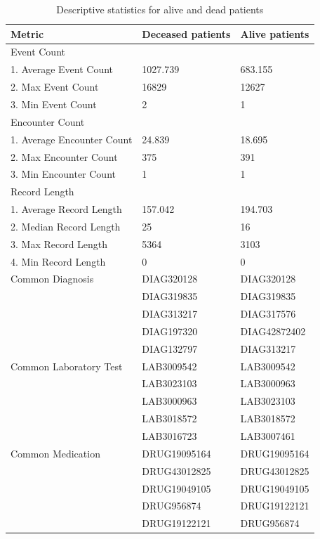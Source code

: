 \documentclass[12pt]{article}
\begin{document}
\begin{table}[th]
\centering
\begin{tabular}{@{}l|l|l}
\toprule
Metric & Deceased patients & Alive patients  \\ \hline
Event Count & & \\ 
1. Average Event Count & 1027.739 & 683.155 \\
2. Max Event Count  & 16829 & 12627\\
3. Min Event Count  & 2 & 1\\ \hline

Encounter Count & & \\ 
1. Average Encounter Count  & 24.839 & 18.695\\
2. Max Encounter Count  & 375 & 391 \\
3. Min Encounter Count  & 1 & 1 \\ \hline

Record Length & &  \\ 
1. Average Record Length & 157.042 & 194.703\\
2. Median Record Length & 25 & 16 \\
3. Max Record Length& 5364 & 3103 \\
4. Min Record Length& 0 & 0 \\ \hline

Common Diagnosis & DIAG320128 & DIAG320128 \\ 
				& DIAG319835 & DIAG319835 \\ 
				& DIAG313217 & DIAG317576 \\
				& DIAG197320 & DIAG42872402 \\
				& DIAG132797 & DIAG313217 \\ \hline

Common Laboratory Test & LAB3009542 & LAB3009542 \\ 
					& LAB3023103 & LAB3000963 \\ 
					& LAB3000963 & LAB3023103 \\ 
					& LAB3018572 & LAB3018572 \\
					& LAB3016723 & LAB3007461 \\ \hline

Common Medication & DRUG19095164 & DRUG19095164 \\ 
				& DRUG43012825 & DRUG43012825 \\ 
				& DRUG19049105 & DRUG19049105 \\ 
				& DRUG956874 & DRUG19122121 \\
				& DRUG19122121 & DRUG956874 \\ \hline
\bottomrule
\end{tabular}
\caption{Descriptive statistics for alive and dead patients\label{tbl:stat}}
\end{table} 
\end{document}
